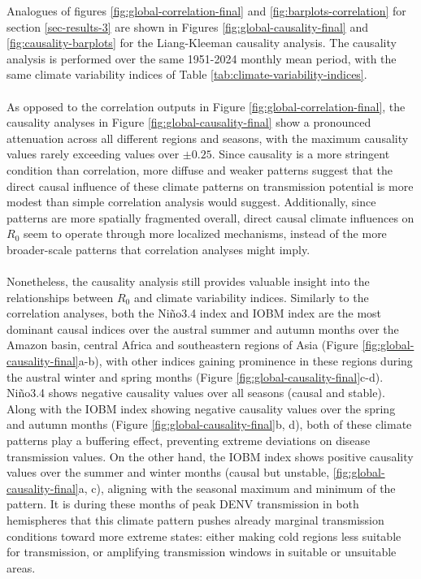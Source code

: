 \documentclass[10pt,twocolumn]{wlscirep}
\begin{document}
Analogues of figures \ref{fig:global-correlation-final} and \ref{fig:barplots-correlation} for section \ref{sec-results-3} are shown in Figures \ref{fig:global-causality-final} and \ref{fig:causality-barplots} for the Liang-Kleeman causality analysis. The causality analysis is performed over the same 1951-2024 monthly mean period, with the same climate variability indices of Table \ref{tab:climate-variability-indices}.
\\
\\
As opposed to the correlation outputs in Figure \ref{fig:global-correlation-final}, the causality analyses in Figure \ref{fig:global-causality-final} show a pronounced attenuation across all different regions and seasons, with the maximum causality values rarely exceeding values over $\pm0.25$. Since causality is a more stringent condition than correlation, more diffuse and weaker patterns suggest that the direct causal influence of these climate patterns on transmission potential is more modest than simple correlation analysis would suggest. Additionally, since patterns are more spatially fragmented overall, direct causal climate influences on $R_0$ seem to operate through more localized mechanisms, instead of the more broader-scale patterns that correlation analyses might imply.
\\
\\
Nonetheless, the causality analysis still provides valuable insight into the relationships between $R_0$ and climate variability indices. Similarly to the correlation analyses, both the Niño3.4 index and IOBM index are the most dominant causal indices over the austral summer and autumn months over the Amazon basin, central Africa and southeastern regions of Asia (Figure \ref{fig:global-causality-final}a-b), with other indices gaining prominence in these regions during the austral winter and spring months (Figure \ref{fig:global-causality-final}c-d). Niño3.4 shows negative causality values over all seasons (causal and stable). Along with the IOBM index showing negative causality values over the spring and autumn months (Figure \ref{fig:global-causality-final}b, d), both of these climate patterns play a buffering effect, preventing extreme deviations on disease transmission values. On the other hand, the IOBM index shows positive causality values over the summer and winter months (causal but unstable, \ref{fig:global-causality-final}a, c), aligning with the seasonal maximum and minimum of the pattern. It is during these months of peak DENV transmission in both hemispheres that this climate pattern pushes already marginal transmission conditions toward more extreme states: either making cold regions less suitable for transmission, or amplifying transmission windows in suitable or unsuitable areas.
\end{document}
